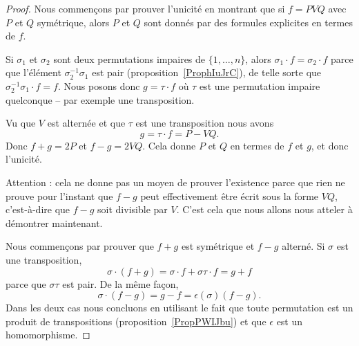 \begin{proof}

    Nous commençons par prouver l'unicité en montrant que si \( f=PVQ\) avec \( P\) et \( Q\) symétrique, alors \( P\) et \( Q\) sont donnés par des formules explicites en termes de \( f\).


    Si \( \sigma_1\) et \( \sigma_2\) sont deux permutations impaires de \( \{ 1,\ldots, n \}\), alors \( \sigma_1\cdot f=\sigma_2\cdot f\) parce que l'élément \( \sigma_2^{-1}\sigma_1\) est pair (proposition~\ref{ProphIuJrC}), de telle sorte que \( \sigma_2^{-1}\sigma_1\cdot f=f\). Nous posons donc \( g=\tau\cdot f\) où \( \tau\) est une permutation impaire quelconque -- par exemple une transposition.

    Vu que \( V\) est alternée et que \( \tau\) est une transposition nous avons
    \begin{equation}
        g=\tau\cdot f=P-VQ.
    \end{equation}
    Donc \( f+g=2P\) et \( f-g=2VQ\). Cela donne \( P\) et \( Q\) en termes de \( f\) et \( g\), et donc l'unicité.

    Attention : cela ne donne pas un moyen de prouver l'existence parce que rien ne prouve pour l'instant que \( f-g\) peut effectivement être écrit sous la forme \( VQ\), c'est-à-dire que \( f-g\) soit divisible par \( V\). C'est cela que nous allons nous atteler à démontrer maintenant.

    Nous commençons par prouver que \( f+g\) est symétrique et \( f-g\) alterné. Si \( \sigma\) est une transposition,
    \begin{equation}
        \sigma\cdot(f+g)=\sigma\cdot f+\sigma\tau\cdot f=g+f
    \end{equation}
    parce que \( \sigma\tau\) est pair. De la même façon,
    \begin{equation}
        \sigma\cdot(f-g)=g-f=\epsilon(\sigma)(f-g).
    \end{equation}
    Dans les deux cas nous concluons en utilisant le fait que toute permutation est un produit de transpositions (proposition~\ref{PropPWIJbu}) et que \( \epsilon\) est un homomorphisme.


\end{proof}
